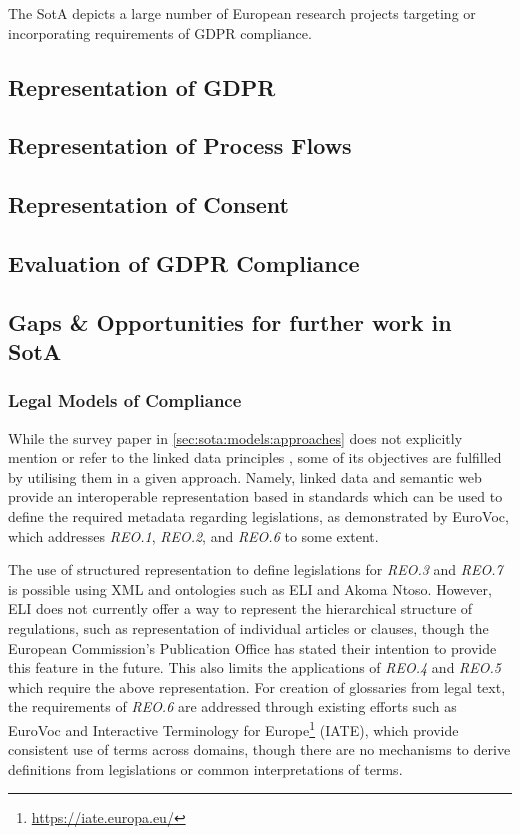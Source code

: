 The SotA depicts a large number of European research projects targeting or incorporating requirements of GDPR compliance.

\subsection{Representation of GDPR}\label{sota:analysis:representation}

\subsection{Representation of Process Flows}\label{sota:analysis:process-flows}

\subsection{Representation of Consent}\label{sota:analysis:consent}

\subsection{Evaluation of GDPR Compliance}\label{sota:analysis:compliance}

\subsection{Gaps \& Opportunities for further work in SotA}\label{sota:analysis:gaps}


\subsubsection{Legal Models of Compliance}
 While the survey paper in \autoref{sec:sota:models:approaches} does not explicitly mention or refer to the linked data principles \cite{bizer_linked_2011}, some of its objectives are fulfilled by utilising them in a given approach. Namely, linked data and semantic web provide an interoperable representation based in standards which can be used to define the required metadata regarding legislations, as demonstrated by EuroVoc, which addresses \textit{REO.1}, \textit{REO.2}, and \textit{REO.6} to some extent.

The use of structured representation to define legislations for \textit{REO.3} and \textit{REO.7} is possible using XML and ontologies such as ELI and Akoma Ntoso. However, ELI does not currently offer a way to represent the hierarchical structure of regulations, such as representation of individual articles or clauses, though the European Commission's Publication Office has stated their intention to provide this feature in the future.
This also limits the applications of \textit{REO.4} and \textit{REO.5} which require the above representation.
For creation of glossaries from legal text, the requirements of \textit{REO.6} are addressed through existing efforts such as EuroVoc and Interactive Terminology for Europe\footnote{\url{https://iate.europa.eu/}} (IATE), which provide consistent use of terms across domains, though there are no mechanisms to derive definitions from legislations or common interpretations of terms.

